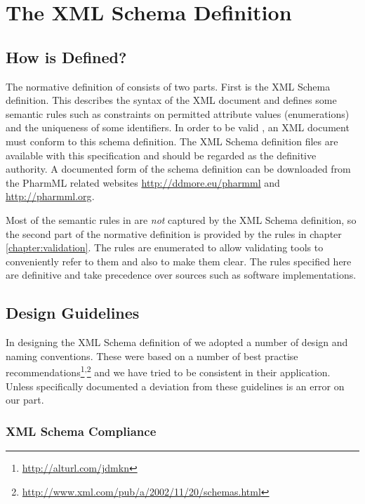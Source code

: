 \chapter{The XML Schema Definition}
\label{techchap:design}
\label{chap:design}

\section{How is \pharmml Defined?}

The normative definition of \pharmml consists of two parts. First is
the XML Schema definition. This describes the syntax of the XML
document and defines some semantic rules such as constraints on
permitted attribute values (enumerations) and the uniqueness of some
identifiers. In order to be valid \pharmml, an XML document must conform to
this schema definition. The XML Schema definition files are
available with this specification and should be regarded as the
definitive authority. 
A documented form of the schema definition can be downloaded from the
PharmML related websites \url{http://ddmore.eu/pharmml} and \url{http://pharmml.org}.

Most of the semantic rules in \pharmml are \emph{not} captured by the XML
Schema definition, so the second part of the normative definition
is provided by the rules in chapter \ref{chapter:validation}. The rules
are enumerated to allow validating tools to conveniently refer to them
and also to make them clear. The rules specified here are definitive
and take precedence over sources such as software implementations.


\section{Design Guidelines}

In designing the XML Schema definition of \pharmml we adopted a number
of design and naming conventions. These were based on a number of best
practise recommendations\footnote{\url{http://alturl.com/jdmkn}}\textsuperscript{,}\footnote{\url{http://www.xml.com/pub/a/2002/11/20/schemas.html}}
and we have tried to be consistent in their application. Unless
specifically documented a deviation from these guidelines is an error on
our part.


\subsection{XML Schema Compliance}


